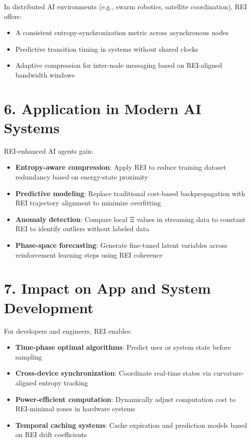 \documentclass[12pt]{article}
\begin{document}
In distributed AI environments (e.g., swarm robotics, satellite coordination), REI offers:
\begin{itemize}
    \item A consistent entropy-synchronization metric across asynchronous nodes
    \item Predictive transition timing in systems without shared clocks
    \item Adaptive compression for inter-node messaging based on REI-aligned bandwidth windows
\end{itemize}

\section{6. Application in Modern AI Systems}

REI-enhanced AI agents gain:
\begin{itemize}
    \item \textbf{Entropy-aware compression}: Apply REI to reduce training dataset redundancy based on energy-state proximity
    \item \textbf{Predictive modeling}: Replace traditional cost-based backpropagation with REI trajectory alignment to minimize overfitting
    \item \textbf{Anomaly detection}: Compare local Ξ values in streaming data to constant REI to identify outliers without labeled data
    \item \textbf{Phase-space forecasting}: Generate fine-tuned latent variables across reinforcement learning steps using REI coherence
\end{itemize}

\section{7. Impact on App and System Development}

For developers and engineers, REI enables:
\begin{itemize}
    \item \textbf{Time-phase optimal algorithms}: Predict user or system state before sampling
    \item \textbf{Cross-device synchronization}: Coordinate real-time states via curvature-aligned entropy tracking
    \item \textbf{Power-efficient computation}: Dynamically adjust computation cost to REI-minimal zones in hardware systems
    \item \textbf{Temporal caching systems}: Cache expiration and prediction models based on REI drift coefficients
\end{itemize}
\end{document}

